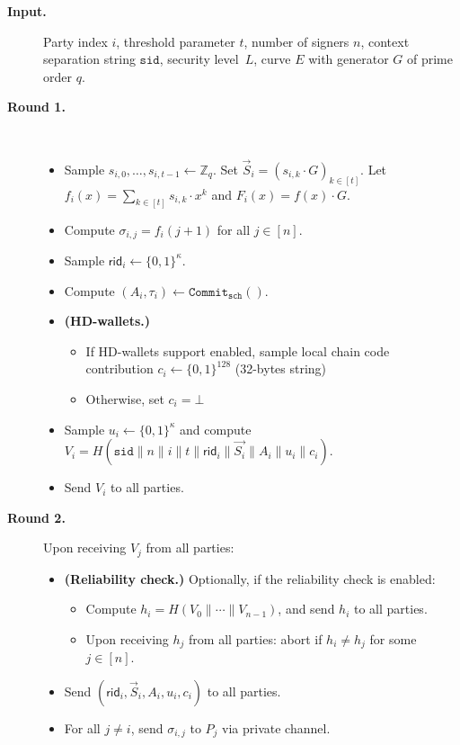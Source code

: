 \documentclass[11pt]{article}
\newcommand{\sid}{\ensuremath{\mathtt{sid}}}
\newcommand{\commit}[1]{\ensuremath{\mathtt{Commit}_{\mathtt{#1}}}}
\newcommand{\rid}{\textsf{rid}}
\newcommand{\Z}{\mathbb{Z}}
\newcommand{\?}[1]{\stackrel{?}{#1}}
\begin{document}
\begin{description}

  \item[\textbf{Input.}]
    Party index $i$,
    threshold parameter $t$,
    number of signers $n$,
    context separation string $\sid$,
    security level~$L$,
    curve $E$ with generator $G$ of prime order $q$.

  \item[\textbf{Round 1.}] \
    \begin{itemize}
      \item Sample $s_{i,0}, \ldots, s_{i,{t-1}} \gets \Z_q$. 
            Set $\vec S_i = (s_{i,k} \cdot G)_{k \in [t]}$.
            Let $f_i(x) = \sum_{k \in [t]} s_{i,k} \cdot x^k$ and $F_i(x) = f(x) \cdot G$.
      \item Compute $\sigma_{i,j} = f_i(j + 1)$ for all $j \in [n]$.
      \item Sample $\rid_i \gets \{0,1\}^\kappa$.
      \item Compute $(A_i, \tau_i) \gets \commit{sch}()$. %
      \item {\bf (HD-wallets.)} 
      \begin{itemize}
        \item If HD-wallets support enabled, sample local chain code contribution $c_i \gets \{0,1\}^{128}$ (32-bytes string)
        \item Otherwise, set $c_i = \bot$
      \end{itemize}

      \item Sample $u_i \gets \{0,1\}^\kappa$
        and compute $V_i = H(\sid\| n\| i\| t\|\rid_i\| \vec{S_i}\| A_i\| u_i \| c_i)$.
      \item Send $V_i$ to all parties.
    \end{itemize}


  \item[\textbf{Round 2.}] 
 Upon receiving $V_j$ from all parties:
    \begin{itemize}
      \item {\bf (Reliability check.)} Optionally, if the reliability check is enabled:
    \begin{itemize}
        \item 
        Compute $h_i = H(V_0 \| \cdots \| V_{n-1})$, and send $h_i$ to all parties.
        
        \item Upon receiving $h_j$ from all  parties: abort if 
        $h_i \neq h_j$ for some $j \in [n]$.
    \end{itemize}
      \item Send $(\rid_i, \vec{S}_i, A_i, u_i, c_i)$ to all parties.
      \item For all $j \neq i$, send $\sigma_{i,j}$ to $P_j$ via private channel.
    \end{itemize}


\end{description}
\end{document}
